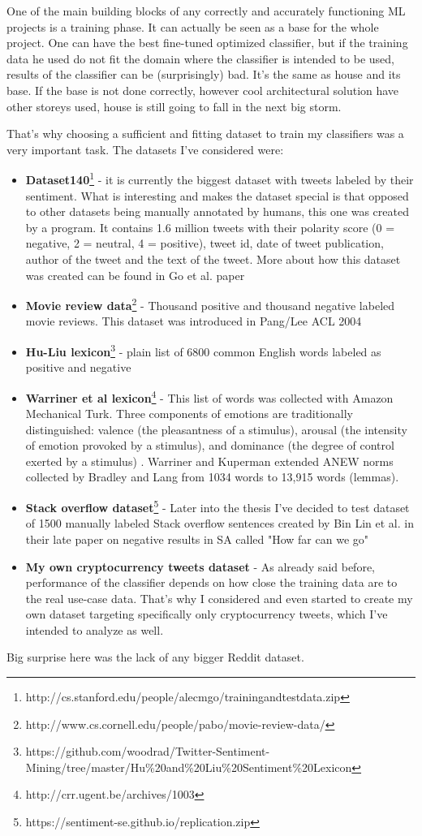 One of the main building blocks of any correctly and accurately functioning ML projects is a training phase. It can actually be seen as a base for the whole project. One can have the best fine-tuned optimized classifier, but if the training data he used do not fit the domain where the classifier is intended to be used, results of the classifier can be (surprisingly) bad. It's the same as house and its base. If the base is not done correctly, however cool architectural solution have other storeys used, house is still going to fall in the next big storm.

That's why choosing a sufficient and fitting dataset to train my classifiers was a very important task. The datasets I've considered were:
\begin{itemize}
  \item \textbf{Dataset140}\footnote{http://cs.stanford.edu/people/alecmgo/trainingandtestdata.zip} - it is currently the biggest dataset with tweets labeled by their sentiment. What is interesting and makes the dataset special is that opposed to other datasets being manually annotated by humans, this one was created by a program. It contains 1.6 million tweets with their polarity score (0 = negative, 2 = neutral, 4 = positive), tweet id, date of tweet publication, author of the tweet and the text of the tweet. More about how this dataset was created can be found in Go et al. paper \cite{go2009twitter}
  \item \textbf{Movie review data}\footnote{http://www.cs.cornell.edu/people/pabo/movie-review-data/} - Thousand positive and thousand negative labeled movie reviews. This dataset was introduced in Pang/Lee ACL 2004 \cite{pang2004sentimental}
  \item \textbf{Hu-Liu lexicon}\footnote{https://github.com/woodrad/Twitter-Sentiment-Mining/tree/master/Hu\%20and\%20Liu\%20Sentiment\%20Lexicon} - plain list of 6800 common English words labeled as positive and negative
  \item \textbf{Warriner et al lexicon}\footnote{http://crr.ugent.be/archives/1003} - This list of words was collected with Amazon Mechanical Turk. Three components of emotions are traditionally distinguished: valence (the pleasantness of a stimulus), arousal (the intensity of emotion provoked by a stimulus), and dominance (the degree of control exerted by a stimulus) \cite{warriner2013norms}. Warriner and Kuperman extended ANEW norms collected by Bradley and Lang from 1034 words to 13,915 words (lemmas).
  \item \textbf{Stack overflow dataset}\footnote{https://sentiment-se.github.io/replication.zip} - Later into the thesis I've decided to test dataset of 1500 manually labeled Stack overflow sentences created by Bin Lin et al. in their late paper on negative results in SA called "How far can we go"
    \item \textbf{My own cryptocurrency tweets dataset} - As already said before, performance of the classifier depends on how close the training data are to the real use-case data. That's why I considered and even started to create my own dataset targeting specifically only cryptocurrency tweets, which I've intended to analyze as well.
\end{itemize}

Big surprise here was the lack of any bigger Reddit dataset.